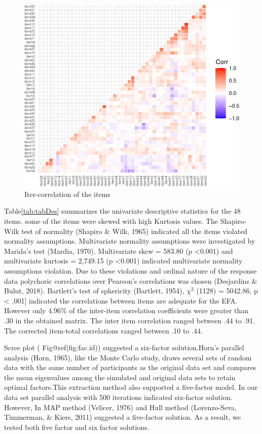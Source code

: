 \documentclass[
  english,
  man]{apa6}
\begin{document}
\begin{figure}
\includegraphics[width=0.5\linewidth]{manuscript_files/figure-latex/figCor-1} \caption{Iter-correlation of the items}\label{fig:figCor}
\end{figure}

Table\ref{tab:tabDes} summarizes the univariate descriptive statistics for the 48 items. some of the items were skewed with high Kurtosis values. The Shapiro-Wilk test of normality (Shapiro \& Wilk, 1965) indicated all the items violated normality assumptions. Multivariate normality assumptions were investigated by Marida's test (Mardia, 1970). Multivariate skew = 583.80 (p \textless0.001) and multivariate kurtosis = 2,749.15 (p \textless0.001) indicated multivariate normality assumptions violation. Due to these violations and ordinal nature of the response data polychoric correlations over Pearson's correlations was chosen (Desjardins \& Bulut, 2018). Bartlett's test of sphericity (Bartlett, 1954), \(\chi^2\) (1128) = 5042.86, p \textless{} .001{]} indicated the correlations between items are adequate for the EFA. However only 4.96\% of the inter-item correlation coefficients were greater than .30 in the obtained matrix. The inter item correlation ranged between .44 to .91. The corrected item-total correlations ranged between .10 to .44.

Scree plot ( Fig@ref(fig:fac.id)) suggested a six-factor solution.Horn's parallel analysis (Horn, 1965), like the Monte Carlo study, draws several sets of random data with the same number of participants as the original data set and compares the mean eigenvalues among the simulated and original data sets to retain optimal factors.This extraction method also supported a five-factor model. In our data set parallel analysis with 500 iterations indicated six-factor solution. However, In MAP method (Velicer, 1976) and Hull method (Lorenzo-Seva, Timmerman, \& Kiers, 2011) suggested a five-factor solution. As a result, we tested both five factor and six factor solutions.
\end{document}

